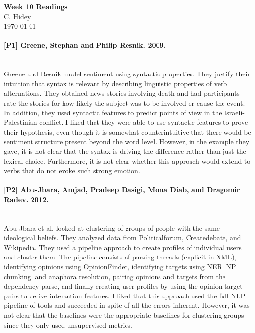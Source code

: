 \documentclass[12pt]{article}
\begin{document}
\begin{center}
  \textbf{Week 10 Readings} \\
  C. Hidey \\
  \today
\end{center}

\paragraph{{\bf [P1] Greene, Stephan and Philip Resnik. 2009.}}
\text{} \\
Greene and Resnik model sentiment using syntactic properties.  They justify their intuition that syntax is relevant by describing linguistic properties of verb alternations.  They obtained news stories involving death and had participants rate the stories for how likely the subject was to be involved or cause the event.  In addition, they used syntactic features to predict points of view in the Israeli-Palestinian conflict.  I liked that they were able to use syntactic features to prove their hypothesis, even though it is somewhat counterintuitive that there would be sentiment structure present beyond the word level.  However, in the example they gave, it is not clear that the syntax is driving the difference rather than just the lexical choice.  Furthermore, it is not clear whether this approach would extend to verbs that do not evoke such strong emotion.

\paragraph{{\bf [P2] Abu-Jbara, Amjad, Pradeep Dasigi, Mona Diab, and Dragomir Radev. 2012.}}
\text{} \\
Abu-Jbara et al. looked at clustering of groups of people with the same ideological beliefs.  They analyzed data from Politicalforum, Createdebate, and Wikipedia.  They used a pipeline approach to create profiles of individual users and cluster them.  The pipeline consists of parsing threads (explicit in XML), identifying opinions using OpinionFinder, identifying targets using NER, NP chunking, and anaphora resolution, pairing opinions and targets from the dependency parse, and finally creating user profiles by using the opinion-target pairs to derive interaction features.  I liked that this approach used the full NLP pipeline of tools and succeeded in spite of all the errors inherent.  However, it was not clear that the baselines were the appropriate baselines for clustering groups since they only used unsupervised metrics.
\end{document}
